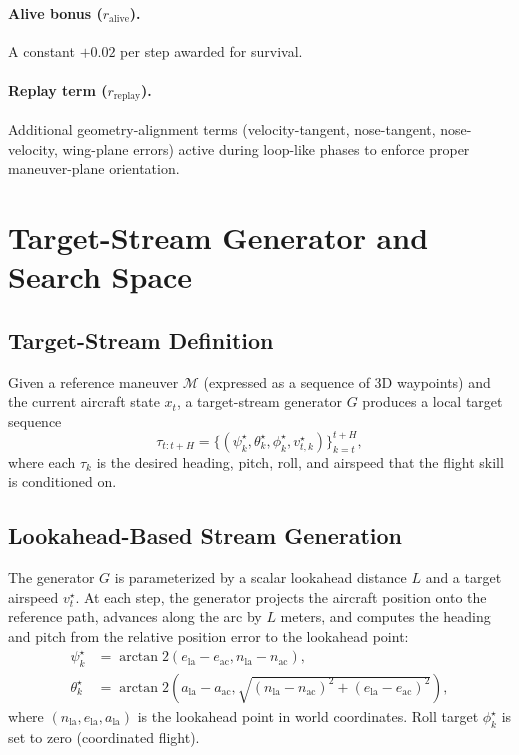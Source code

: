 \documentclass{article}
\begin{document}
\paragraph{Alive bonus ($r_{\mathrm{alive}}$).}
A constant $+0.02$ per step awarded for survival.

\paragraph{Replay term ($r_{\mathrm{replay}}$).}
Additional geometry-alignment terms (velocity-tangent, nose-tangent,
nose-velocity, wing-plane errors) active during loop-like phases to
enforce proper maneuver-plane orientation.

\section{Target-Stream Generator and Search Space}
\label{app:target-stream}

\subsection{Target-Stream Definition}

Given a reference maneuver $\mathcal{M}$ (expressed as a sequence of
3D waypoints) and the current aircraft state $x_t$, a target-stream
generator $G$ produces a local target sequence
\begin{equation}
  \tau_{t:t+H} = \bigl\{(\psi_k^\star, \theta_k^\star, \phi_k^\star, v_{t,k}^\star)\bigr\}_{k=t}^{t+H},
\end{equation}
where each $\tau_k$ is the desired heading, pitch, roll, and airspeed
that the flight skill is conditioned on.

\subsection{Lookahead-Based Stream Generation}

The generator $G$ is parameterized by a scalar lookahead distance $L$
and a target airspeed $v_t^\star$.  At each step, the generator
projects the aircraft position onto the reference path, advances along
the arc by $L$ meters, and computes the heading and pitch from the
relative position error to the lookahead point:
\begin{align}
  \psi_k^\star &= \arctan2(e_{\mathrm{la}} - e_{\mathrm{ac}},
                            n_{\mathrm{la}} - n_{\mathrm{ac}}), \\
  \theta_k^\star &= \arctan2(a_{\mathrm{la}} - a_{\mathrm{ac}},
                              \sqrt{(n_{\mathrm{la}} - n_{\mathrm{ac}})^2
                                  + (e_{\mathrm{la}} - e_{\mathrm{ac}})^2}),
\end{align}
where $(n_{\mathrm{la}}, e_{\mathrm{la}}, a_{\mathrm{la}})$ is the
lookahead point in world coordinates.  Roll target $\phi_k^\star$ is
set to zero (coordinated flight).
\end{document}
